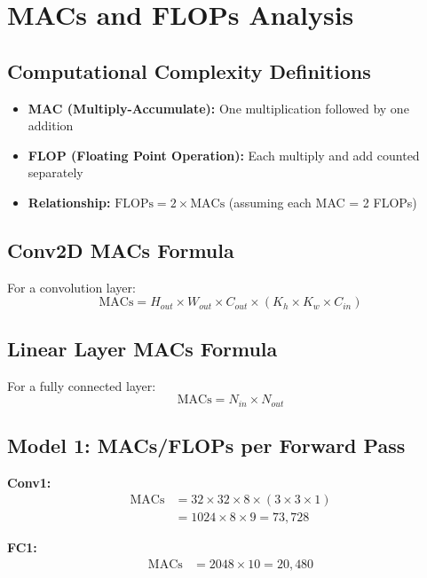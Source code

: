 \documentclass[11pt,a4paper]{article}
\begin{document}
\section{MACs and FLOPs Analysis}

\subsection{Computational Complexity Definitions}
\begin{itemize}
    \item \textbf{MAC (Multiply-Accumulate):} One multiplication followed by one addition
    \item \textbf{FLOP (Floating Point Operation):} Each multiply and add counted separately
    \item \textbf{Relationship:} $\text{FLOPs} = 2 \times \text{MACs}$ (assuming each MAC = 2 FLOPs)
\end{itemize}

\subsection{Conv2D MACs Formula}
For a convolution layer:
\begin{equation}
\text{MACs} = H_{out} \times W_{out} \times C_{out} \times (K_h \times K_w \times C_{in})
\end{equation}

\subsection{Linear Layer MACs Formula}
For a fully connected layer:
\begin{equation}
\text{MACs} = N_{in} \times N_{out}
\end{equation}

\subsection{Model 1: MACs/FLOPs per Forward Pass}

\textbf{Conv1:}
\begin{align*}
\text{MACs} &= 32 \times 32 \times 8 \times (3 \times 3 \times 1) \\
&= 1024 \times 8 \times 9 = 73,728
\end{align*}

\textbf{FC1:}
\begin{align*}
\text{MACs} &= 2048 \times 10 = 20,480
\end{align*}
\end{document}
